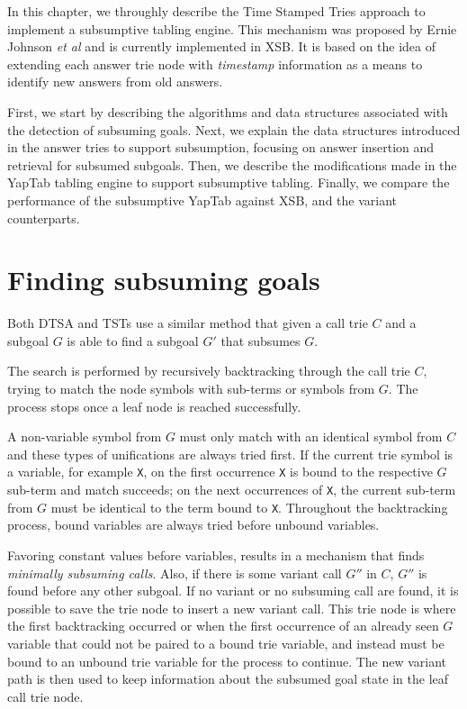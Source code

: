 In this chapter, we throughly describe the Time Stamped Tries approach
to implement a subsumptive tabling engine. This mechanism was proposed by
Ernie Johnson \textit{et al} \cite{Johnson-99} and is currently implemented in XSB.
It is based on the idea of extending each answer trie node with \textit{timestamp}
information as a means to identify new answers from old answers.

First, we start by describing the algorithms and data structures associated
with the detection of subsuming goals. Next, we explain the data structures
introduced in the answer tries to support subsumption, focusing on answer insertion
and retrieval for subsumed subgoals. Then, we describe the modifications made in the YapTab
tabling engine to support subsumptive tabling. Finally, we compare the performance of
the subsumptive YapTab against XSB, and the variant counterparts.

\section{Finding subsuming goals}\label{sec:lookup_subsuming}

Both DTSA and TSTs use a similar method that given a call trie $C$ and a subgoal $G$
is able to find a subgoal $G'$ that subsumes $G$.

The search is performed by recursively backtracking through the call trie $C$, trying
to match the node symbols with sub-terms or symbols from $G$. The process stops
once a leaf node is reached successfully.

A non-variable symbol from $G$ must only match with an identical symbol from $C$ and
these types of unifications are always tried first.
If the current trie symbol is a variable, for example \texttt{X}, on the first occurrence \texttt{X}
is bound to the respective $G$ sub-term
and match succeeds; on the next occurrences of \texttt{X}, the current sub-term from $G$ must
be identical to the term bound to \texttt{X}. Throughout the backtracking process, bound variables are
always tried before unbound variables.

Favoring constant values before variables, results in a mechanism that finds \textit{minimally subsuming calls}.
Also, if there is some variant call $G''$ in $C$, $G''$ is found before any other subgoal. If no variant 
or no subsuming call are found, it is possible to save the trie node to insert a new variant call.
This trie node is where the first backtracking occurred or when the first occurrence of
an already seen $G$ variable that could not be paired to a bound trie variable, and instead
must be bound to an unbound trie variable for the process to continue.
The new variant path is then used to keep information about the subsumed goal state in
the leaf call trie node.

